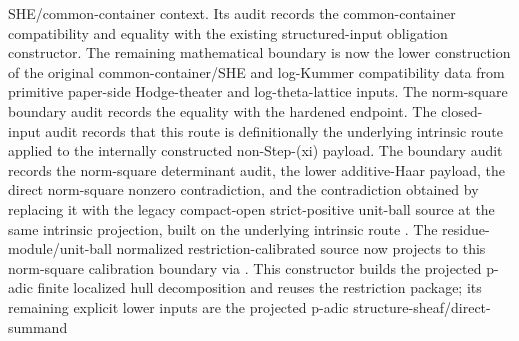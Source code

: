 \begin{proposition}
  SHE/common-container context.  Its audit
  records the common-container compatibility and equality with the existing
  structured-input obligation constructor.
  The remaining mathematical boundary is now the lower construction of the
  original common-container/SHE and log-Kummer compatibility data from primitive
  paper-side Hodge-theater and log-theta-lattice inputs.  The
  norm-square boundary audit
  records the equality with the hardened endpoint.
  The closed-input audit
  records that this route is definitionally the underlying intrinsic route
  applied to the internally constructed non-Step-(xi) payload.  The boundary audit
  records the norm-square determinant audit, the lower additive-Haar payload,
  the direct norm-square nonzero contradiction, and the contradiction obtained
  by replacing it with the legacy compact-open strict-positive unit-ball source
  at the same intrinsic projection,
  built on the underlying intrinsic route
  .
  The residue-module/unit-ball normalized restriction-calibrated source now
  projects to this norm-square calibration boundary via
  .
  This constructor builds the projected p-adic finite localized hull
  decomposition and reuses the restriction package; its remaining explicit
  lower inputs are the projected p-adic structure-sheaf/direct-summand

\end{proposition}
